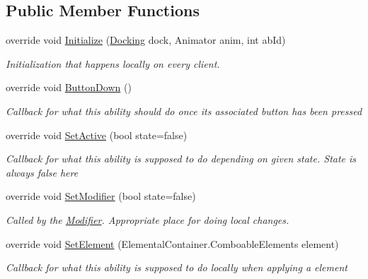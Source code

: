 \subsection*{Public Member Functions}
\begin{DoxyCompactItemize}
\item 
override void \hyperlink{class_basic_slash_afc9c8ccb32b322317f157f9a5d06e925}{Initialize} (\hyperlink{class_docking}{Docking} dock, Animator anim, int ab\+Id)
\begin{DoxyCompactList}\small\item\em Initialization that happens locally on every client. \end{DoxyCompactList}\item 
override void \hyperlink{class_basic_slash_a83d162978fe54d3c4fffc283d8efcde3}{Button\+Down} ()
\begin{DoxyCompactList}\small\item\em Callback for what this ability should do once its associated button has been pressed \end{DoxyCompactList}\item 
override void \hyperlink{class_basic_slash_abdc12ca8455ffa035c0a5b395d79b2ba}{Set\+Active} (bool state=false)
\begin{DoxyCompactList}\small\item\em Callback for what this ability is supposed to do depending on given state. State is always false here \end{DoxyCompactList}\item 
override void \hyperlink{class_basic_slash_af42d098906ac33974f266ccc3b2aba6d}{Set\+Modifier} (bool state=false)
\begin{DoxyCompactList}\small\item\em Called by the \hyperlink{class_modifier}{Modifier}. Appropriate place for doing local changes. \end{DoxyCompactList}\item 
override void \hyperlink{class_basic_slash_ae5dd6639a4e305717f5e3344b1cec143}{Set\+Element} (Elemental\+Container.\+Comboable\+Elements element)
\begin{DoxyCompactList}\small\item\em Callback for what this ability is supposed to do locally when applying a element \end{DoxyCompactList}\end{DoxyCompactItemize}
